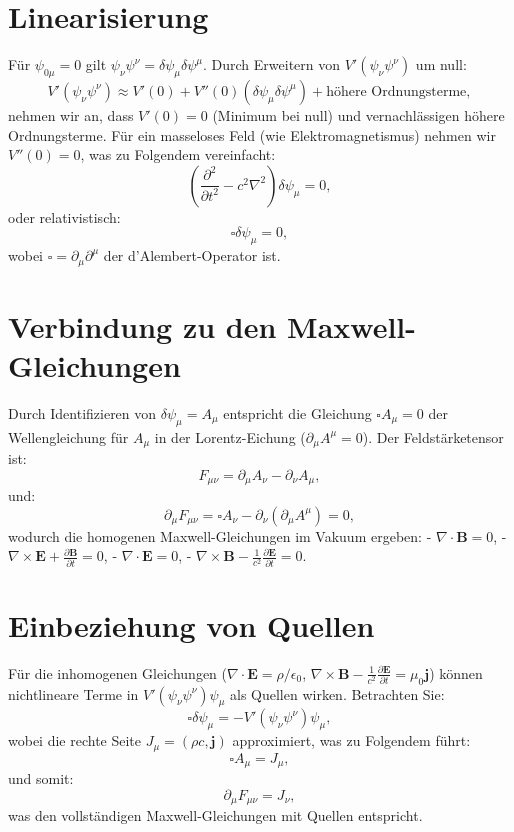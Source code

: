 \documentclass{article}
\begin{document}
	\section{Linearisierung}
	Für \(\psi_{0\mu} = 0\) gilt \(\psi_\nu \psi^\nu = \delta \psi_\mu \delta \psi^\mu\). Durch Erweitern von \(V'(\psi_\nu \psi^\nu)\) um null:
	\[
	V'(\psi_\nu \psi^\nu) \approx V'(0) + V''(0) (\delta \psi_\mu \delta \psi^\mu) + \text{höhere Ordnungsterme},
	\]
	nehmen wir an, dass \(V'(0) = 0\) (Minimum bei null) und vernachlässigen höhere Ordnungsterme. Für ein masseloses Feld (wie Elektromagnetismus) nehmen wir \(V''(0) = 0\), was zu Folgendem vereinfacht:
	\[
	\left( \frac{\partial^2}{\partial t^2} - c^2 \nabla^2 \right) \delta \psi_\mu = 0,
	\]
	oder relativistisch:
	\[
	\square \delta \psi_\mu = 0,
	\]
	wobei \(\square = \partial_\mu \partial^\mu\) der d'Alembert-Operator ist.
	
	\section{Verbindung zu den Maxwell-Gleichungen}
	Durch Identifizieren von \(\delta \psi_\mu = A_\mu\) entspricht die Gleichung \(\square A_\mu = 0\) der Wellengleichung für \(A_\mu\) in der Lorentz-Eichung (\(\partial_\mu A^\mu = 0\)). Der Feldstärketensor ist:
	\[
	F_{\mu\nu} = \partial_\mu A_\nu - \partial_\nu A_\mu,
	\]
	und:
	\[
	\partial_\mu F_{\mu\nu} = \square A_\nu - \partial_\nu (\partial_\mu A^\mu) = 0,
	\]
	wodurch die homogenen Maxwell-Gleichungen im Vakuum ergeben:
	- \(\nabla \cdot \mathbf{B} = 0\),
	- \(\nabla \times \mathbf{E} + \frac{\partial \mathbf{B}}{\partial t} = 0\),
	- \(\nabla \cdot \mathbf{E} = 0\),
	- \(\nabla \times \mathbf{B} - \frac{1}{c^2} \frac{\partial \mathbf{E}}{\partial t} = 0\).
	
	\section{Einbeziehung von Quellen}
	Für die inhomogenen Gleichungen (\(\nabla \cdot \mathbf{E} = \rho / \epsilon_0\), \(\nabla \times \mathbf{B} - \frac{1}{c^2} \frac{\partial \mathbf{E}}{\partial t} = \mu_0 \mathbf{j}\)) können nichtlineare Terme in \(V'(\psi_\nu \psi^\nu) \psi_\mu\) als Quellen wirken. Betrachten Sie:
	\[
	\square \delta \psi_\mu = -V'(\psi_\nu \psi^\nu) \psi_\mu,
	\]
	wobei die rechte Seite \(J_\mu = (\rho c, \mathbf{j})\) approximiert, was zu Folgendem führt:
	\[
	\square A_\mu = J_\mu,
	\]
	und somit:
	\[
	\partial_\mu F_{\mu\nu} = J_\nu,
	\]
	was den vollständigen Maxwell-Gleichungen mit Quellen entspricht.
	
\end{document}
